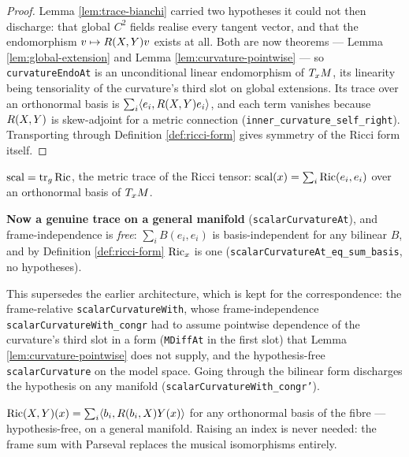 \begin{proof}
  \leanok
  Lemma \ref{lem:trace-bianchi} carried two hypotheses it could not then
  discharge: that global $C^2$ fields realise every tangent vector, and that the
  endomorphism $v \mapsto R(X,Y)v$ exists at all. Both are now theorems ---
  Lemma \ref{lem:global-extension} and Lemma \ref{lem:curvature-pointwise} ---
  so \texttt{curvatureEndoAt} is an unconditional linear endomorphism of
  $T_xM$, its linearity being tensoriality of the curvature's third slot on
  global extensions. Its trace over an orthonormal basis is $\sum_i \langle e_i,
  R(X,Y)e_i \rangle$, and each term vanishes because $R(X,Y)$ is
  skew-adjoint for a metric connection (\texttt{inner\_curvature\_self\_right}).
  Transporting through Definition \ref{def:ricci-form} gives symmetry of the
  Ricci form itself.
\end{proof}

\begin{definition}
  \label{def:scalar}
  \leanok
  $\operatorname{scal} = \operatorname{tr}_g \operatorname{Ric}$, the metric trace of the Ricci tensor:
  $\operatorname{scal}(x) = \sum_i \operatorname{Ric}(e_i, e_i)$ over an orthonormal basis of $T_xM$.

  \textbf{Now a genuine trace on a general manifold}
  (\texttt{scalarCurvatureAt}), and frame-independence is \emph{free}:
  $\sum_i B(e_i,e_i)$ is basis-independent for any bilinear $B$, and by
  Definition \ref{def:ricci-form} $\operatorname{Ric}_x$ is one
  (\texttt{scalarCurvatureAt\_eq\_sum\_basis}, no hypotheses).

  This supersedes the earlier architecture, which is kept for the
  correspondence: the frame-relative \texttt{scalarCurvatureWith}, whose
  frame-independence \texttt{scalarCurvatureWith\_congr} had to assume
  pointwise dependence of the curvature's third slot in a form
  (\texttt{MDiffAt} in the first slot) that Lemma
  \ref{lem:curvature-pointwise} does not supply, and the hypothesis-free
  \texttt{scalarCurvature} on the model space. Going through the bilinear form
  discharges the hypothesis on any manifold
  (\texttt{scalarCurvatureWith\_congr'}).
\end{definition}

\begin{lemma}
  \label{lem:ricci-frame-sum}
  \leanok
  $\operatorname{Ric}(X,Y)(x) = \sum_i \langle b_i, R(b_i, X)Y(x)\rangle$ for any
  orthonormal basis of the fibre --- hypothesis-free, on a general manifold.
  Raising an index is never needed: the frame sum with Parseval replaces the
  musical isomorphisms entirely.
\end{lemma}

